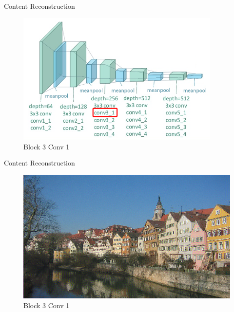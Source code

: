 \documentclass{beamer}
\begin{document}
\begin{frame}{Content Reconstruction}
\begin{figure}[ht]
\centering
\includegraphics[width=0.9\textwidth]{img/vgg19/content/block3_conv1}
\caption{Block 3 Conv 1}
\end{figure}
\end{frame}
\begin{frame}{Content Reconstruction}
\begin{figure}[ht]
\centering
\includegraphics[width=\textwidth]{img/content/block3_conv1.png}
\caption{Block 3 Conv 1}
\end{figure}
\end{frame}
\end{document}
